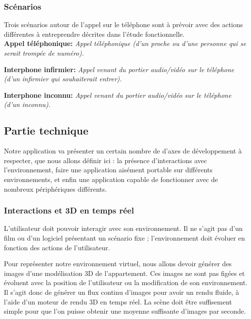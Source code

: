 \subsubsection{Scénarios}
Trois scénarios autour de l'appel sur le téléphone sont à prévoir avec des actions différentes à entreprendre décrites dans l'étude fonctionnelle. \\

\textbf{Appel téléphonique: }\textit{Appel téléphonique (d'un proche ou d'une personne qui se serait trompée de numéro). }

\textbf{Interphone infirmier: } \textit{Appel venant du portier audio/vidéo sur le téléphone (d'un infirmier qui souhaiterait entrer). }

\textbf{Interphone inconnu: } \textit{Appel venant du portier audio/vidéo sur le téléphone (d'un inconnu). }

\subsection{Partie technique}

Notre application va présenter un certain nombre de d'axes de développement à respecter, que nous allons définir ici : la présence d'interactions avec l'environnement, faire une application aisément portable sur différents environnements, et enfin une application capable de fonctionner avec de nombreux périphériques différents. 

\subsubsection{Interactions et 3D en temps réel}
L'utilisateur doit pouvoir interagir avec son environnement. Il ne s'agit pas d'un film ou d'un logiciel présentant un scénario fixe ; l'environnement doit évoluer en fonction des actions de l'utilisateur.

Pour représenter notre environnement virtuel, nous allons devoir générer des images d'une modélisation 3D de l'appartement. Ces images ne sont pas figées et évoluent avec la position de l'utilisateur ou la modification de son environnement. Il s'agit donc de générer un flux continu d'images pour avoir un rendu fluide, à l'aide d'un moteur de rendu 3D en temps réel. La scène doit être suffisement simple pour que l'on puisse obtenir une moyenne suffisante d'images par seconde.

